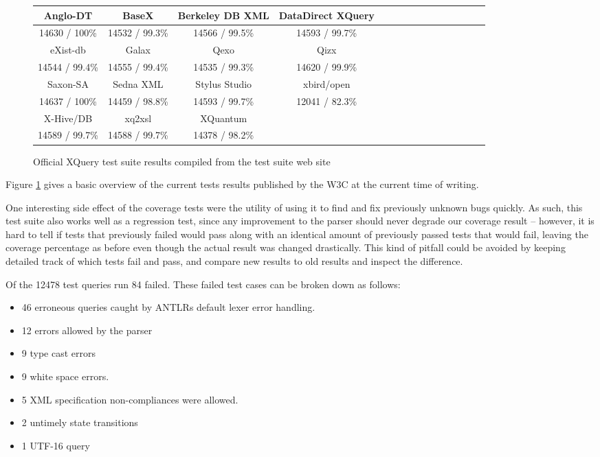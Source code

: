 \begin{figure}[h!]
  \begin{center}
    \begin{tabular}{ |c | c | c | c | c | c | c | c | c | c | c | c | c | c | c | }
      \hline
      Anglo-DT        & BaseX           & Berkeley DB XML   & DataDirect XQuery \\ \hline
      14630 / 100\%   & 14532 / 99.3\%  & 14566 / 99.5\%    & 14593 / 99.7\%  \\ \hline \hline
      eXist-db        & Galax           & Qexo              & Qizx \\ \hline            
      14544 / 99.4\%  & 14555 / 99.4\%  & 14535 / 99.3\%    & 14620 / 99.9\% \\ \hline \hline
      Saxon-SA        & Sedna XML       & Stylus Studio     & xbird/open \\ \hline
      14637 / 100\%   & 14459 / 98.8\%  & 14593 / 99.7\%    & 12041 / 82.3\% \\ \hline \hline
      X-Hive/DB       & xq2xsl          & XQuantum          & \\ \hline
      14589 / 99.7\%   & 14588 / 99.7\%  & 14378 / 98.2\%    & \\ 
    \hline
    \end{tabular}
  \end{center}
  \caption[Official XQuery test suite results]{Official XQuery test suite
  results compiled from the test suite web site\cite{w3ctestresults}} 
  \label{figure:table:w3c_test_results}
\end{figure}

Figure \ref{figure:table:w3c_test_results} gives a basic overview of the current
tests results published by the W3C at the current time of writing.

One interesting side effect of the coverage tests were the utility of using it to
find and fix previously unknown bugs quickly. As such, this test suite also
works well as a regression test, since any improvement to the parser should
never degrade our coverage result -- however, it is hard to tell if tests that
previously failed would pass along with an identical amount of previously
passed tests that would fail, leaving the coverage percentage as before even
though the actual result was changed drastically. This kind of pitfall could be
avoided by keeping detailed track of which tests fail and pass, and compare new
results to old results and inspect the difference.

Of the 12478 test queries run 84 failed. These failed test cases can be broken
down as follows: 
\begin{itemize}
\item 46 erroneous queries caught by ANTLRs default lexer error handling.
\item 12 errors allowed by the parser
\item 9 type cast errors
\item 9 white space errors.
\item 5 XML specification non-compliances were allowed.
\item 2 untimely state transitions
\item 1 UTF-16 query
\end{itemize}

